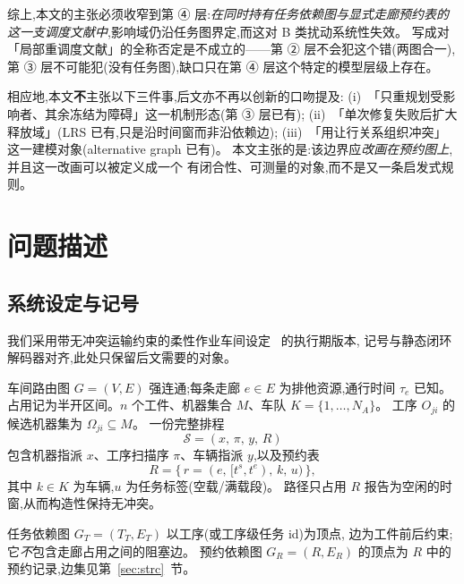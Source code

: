\documentclass[manuscript,screen,review]{acmart}
\begin{document}
综上,本文的主张必须收窄到第 ④ 层:\emph{在同时持有任务依赖图与显式走廊预约表的
这一支调度文献中},影响域仍沿任务图界定,而这对 B 类扰动系统性失效。
写成对「局部重调度文献」的全称否定是不成立的——第 ② 层不会犯这个错(两图合一),
第 ③ 层不可能犯(没有任务图),缺口只在第 ④ 层这个特定的模型层级上存在。

相应地,本文\textbf{不}主张以下三件事,后文亦不再以创新的口吻提及:
(i)~「只重规划受影响者、其余冻结为障碍」这一机制形态(第 ③ 层已有);
(ii)~「单次修复失败后扩大释放域」(LRS 已有,只是沿时间窗而非沿依赖边);
(iii)~「用让行关系组织冲突」这一建模对象(alternative graph 已有)。
本文主张的是:该边界应\emph{改画在预约图上},并且这一改画可以被定义成一个
有闭合性、可测量的对象,而不是又一条启发式规则。

\section{问题描述}
\label{sec:problem}

\subsection{系统设定与记号}
\label{sec:system_brief}

我们采用带无冲突运输约束的柔性作业车间设定~\cite{vanos2026exact} 的执行期版本,
记号与静态闭环解码器对齐,此处只保留后文需要的对象。

车间路由图 \(G=(V,E)\) 强连通;每条走廊 \(e\in E\) 为排他资源,通行时间 \(\tau_e\) 已知。
占用记为半开区间。\(n\) 个工件、机器集合 \(M\)、车队 \(K=\{1,\ldots,N_A\}\)。
工序 \(O_{ji}\) 的候选机器集为 \(\Omega_{ji}\subseteq M\)。
一份完整排程
\[
\mathcal{S}=(x,\,\pi,\,y,\,R)
\]
包含机器指派 \(x\)、工序扫描序 \(\pi\)、车辆指派 \(y\),以及预约表
\[
R=\bigl\{\,r=(e,\,[t^s,t^e),\,k,\,u)\,\bigr\},
\]
其中 \(k\in K\) 为车辆,\(u\) 为任务标签(空载/满载段)。
路径只占用 \(R\) 报告为空闲的时窗,从而构造性保持无冲突。

任务依赖图 \(G_T=(T_T,E_T)\) 以工序(或工序级任务 id)为顶点,
边为工件前后约束;它\emph{不}包含走廊占用之间的阻塞边。
预约依赖图 \(G_R=(R,E_R)\) 的顶点为 \(R\) 中的预约记录,边集见第~\ref{sec:strc}~节。
\end{document}
